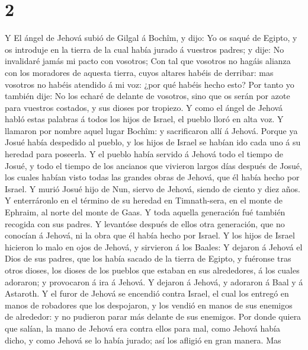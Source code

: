 \hypertarget{section-1}{%
\section{2}\label{section-1}}

 Y El ángel de Jehová subió de Gilgal á Bochîm, y dijo: Yo
os saqué de Egipto, y os introduje en la tierra de la cual había jurado
á vuestros padres; y dije: No invalidaré jamás mi pacto con vosotros;
 Con tal que vosotros no hagáis alianza con los moradores
de aquesta tierra, cuyos altares habéis de derribar: mas vosotros no
habéis atendido á mi voz: ¿por qué habéis hecho esto?  Por
tanto yo también dije: No los echaré de delante de vosotros, sino que os
serán por azote para vuestros costados, y sus dioses por tropiezo.
 Y como el ángel de Jehová habló estas palabras á todos
los hijos de Israel, el pueblo lloró en alta voz.  Y
llamaron por nombre aquel lugar Bochîm: y sacrificaron allí á Jehová.
 Porque ya Josué había despedido al pueblo, y los hijos de
Israel se habían ido cada uno á su heredad para poseerla. 
Y el pueblo había servido á Jehová todo el tiempo de Josué, y todo el
tiempo de los ancianos que vivieron largos días después de Josué, los
cuales habían visto todas las grandes obras de Jehová, que él había
hecho por Israel.  Y murió Josué hijo de Nun, siervo de
Jehová, siendo de ciento y diez años.  Y enterráronlo en
el término de su heredad en Timnath-sera, en el monte de Ephraim, al
norte del monte de Gaas.  Y toda aquella generación fué
también recogida con sus padres. Y levantóse después de ellos otra
generación, que no conocían á Jehová, ni la obra que él había hecho por
Israel.  Y los hijos de Israel hicieron lo malo en ojos
de Jehová, y sirvieron á los Baales:  Y dejaron á Jehová
el Dios de sus padres, que los había sacado de la tierra de Egipto, y
fuéronse tras otros dioses, los dioses de los pueblos que estaban en sus
alrededores, á los cuales adoraron; y provocaron á ira á Jehová.
 Y dejaron á Jehová, y adoraron á Baal y á Astaroth.
 Y el furor de Jehová se encendió contra Israel, el cual
los entregó en manos de robadores que los despojaron, y los vendió en
manos de sus enemigos de alrededor: y no pudieron parar más delante de
sus enemigos.  Por donde quiera que salían, la mano de
Jehová era contra ellos para mal, como Jehová había dicho, y como Jehová
se lo había jurado; así los afligió en gran manera.  Mas
